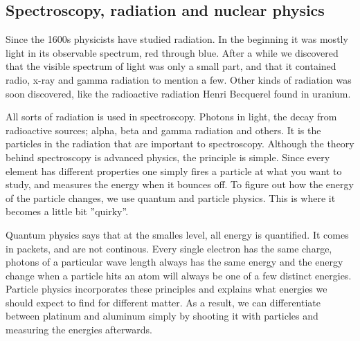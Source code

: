 \subsection*{Spectroscopy, radiation and nuclear physics}
Since the 1600s physicists have studied radiation.
In the beginning it was mostly light in its observable spectrum, red through blue.
After a while we discovered that the visible spectrum of light was only a small part, and that it contained radio, x-ray and gamma radiation to mention a few.
Other kinds of radiation was soon discovered, like the radioactive radiation Henri Becquerel \cite{First_radioactivity} found in uranium.


All sorts of radiation is used in spectroscopy. Photons in light, the decay from radioactive sources; alpha, beta and gamma radiation and others.
It is the particles in the radiation that are important to spectroscopy.
Although the theory behind spectroscopy is advanced physics, the principle is simple.
Since every element has different properties one simply fires a particle at what you want to study, and measures the energy when it bounces off.
To figure out how the energy of the particle changes, we use quantum and particle physics.
This is where it becomes a little bit ''quirky''.


Quantum physics says that at the smalles level, all energy is quantified.
It comes in packets, and are not continous.
Every single electron has the same charge, photons of a particular wave length always has the same energy and the energy change when a particle hits an atom will always be one of a few distinct energies.
Particle physics incorporates these principles and explains what energies we should expect to find for different matter.
As a result, we can differentiate between platinum and aluminum simply by shooting it with particles and measuring the energies afterwards.